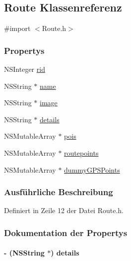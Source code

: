 \hypertarget{interface_route}{
\subsection{Route Klassenreferenz}
\label{interface_route}
}


{\ttfamily \#import $<$Route.h$>$}\subsubsection*{Propertys}
\begin{DoxyCompactItemize}
\item 
NSInteger \hyperlink{interface_route_a0d881da071b4c7b17ef600672bd25698}{rid}
\item 
NSString $\ast$ \hyperlink{interface_route_a3634bcbb7277dd09256f85b8ac708e69}{name}
\item 
NSString $\ast$ \hyperlink{interface_route_a461ded6f64d5b7da83e9aaa31c4f31c6}{image}
\item 
NSString $\ast$ \hyperlink{interface_route_aa16ca2feba08e3fbcbcf65e0d4f6f583}{details}
\item 
NSMutableArray $\ast$ \hyperlink{interface_route_a0e0471c4dc01c66a7e412e390bce7571}{pois}
\item 
NSMutableArray $\ast$ \hyperlink{interface_route_ac914a04bbdf46f1d6dcf3359d4f8d98a}{routepoints}
\item 
NSMutableArray $\ast$ \hyperlink{interface_route_ad8a3b460a65086d981a3ca43e7afe094}{dummyGPSPoints}
\end{DoxyCompactItemize}


\subsubsection{Ausführliche Beschreibung}


Definiert in Zeile 12 der Datei Route.h.

\subsubsection{Dokumentation der Propertys}
\hypertarget{interface_route_aa16ca2feba08e3fbcbcf65e0d4f6f583}{
\paragraph[{details}]{\setlength{\rightskip}{0pt plus 5cm}-\/ (NSString $\ast$) details}\hfill}
\label{interface_route_aa16ca2feba08e3fbcbcf65e0d4f6f583}


